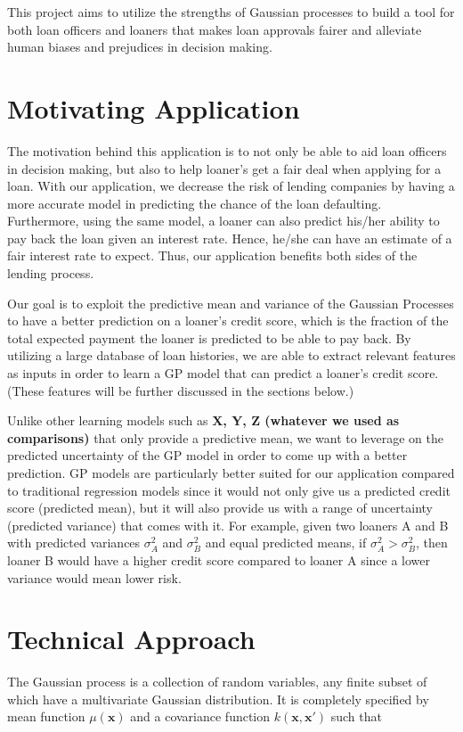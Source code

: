 \documentclass[a4paper]{article}
\theoremstyle{genius}
\begin{document}
This project aims to utilize the strengths of Gaussian processes to build a tool for both loan officers and loaners that makes loan approvals fairer and alleviate human biases and prejudices in decision making.

\section{Motivating Application}
The motivation behind this application is to not only be able to aid loan officers in decision making, but also to help loaner's get a fair deal when applying for a loan. With our application, we decrease the risk of lending companies by having a more accurate model in predicting the chance of the loan defaulting. Furthermore, using the same model, a loaner can also predict his/her ability to pay back the loan given an interest rate. Hence, he/she can have an estimate of a fair interest rate to expect. Thus, our application benefits both sides of the lending process.

Our goal is to exploit the predictive mean and variance of the Gaussian Processes to have a better prediction on a loaner's credit score, which is the fraction of the total expected payment the loaner is predicted to be able to pay back. By utilizing a large database of loan histories, we are able to extract relevant features as inputs in order to learn a GP model that can predict a loaner's credit score. (These features will be further discussed in the sections below.) 

Unlike other learning models such as \textbf{X, Y, Z (whatever we used as comparisons)} that only provide a predictive mean, we want to leverage on the predicted uncertainty of the GP model in order to come up with a better prediction. GP models are particularly better suited for our application compared to traditional regression models since it would not only give us a predicted credit score (predicted mean), but it will also provide us with a range of uncertainty (predicted variance) that comes with it. For example, given two loaners A and B with predicted variances $\sigma_{A}^2$ and $\sigma_{B}^2$ and equal predicted means, if $\sigma_{A}^2>\sigma_{B}^2$, then loaner B would have a higher credit score compared to loaner A since a lower variance would mean lower risk.

\section{Technical Approach}
The Gaussian process is a collection of random variables, any finite subset of which have a multivariate Gaussian distribution. It is completely specified by mean function $\mu(\textbf{x})$ and a covariance function $k(\textbf{x},\textbf{x}')$ such that
\end{document}
